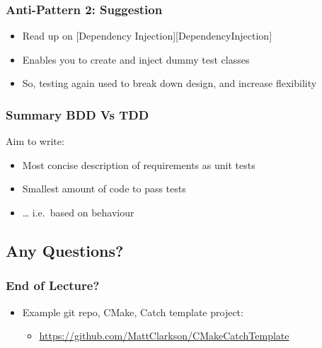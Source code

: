 \subsubsection{Anti-Pattern 2:
Suggestion}\label{anti-pattern-2-suggestion}

\begin{itemize}
\itemsep1pt\parskip0pt
\item
  Read up on {[}Dependency Injection{]}{[}DependencyInjection{]}
\item
  Enables you to create and inject dummy test classes
\item
  So, testing again used to break down design, and increase flexibility
\end{itemize}

\subsubsection{Summary BDD Vs TDD}\label{summary-bdd-vs-tdd}

Aim to write:

\begin{itemize}
\itemsep1pt\parskip0pt
\item
  Most concise description of requirements as unit tests
\item
  Smallest amount of code to pass tests
\item
  \ldots{} i.e.~based on behaviour
\end{itemize}

\subsection{Any Questions?}\label{any-questions}

\subsubsection{End of Lecture?}\label{end-of-lecture}

\begin{itemize}
\itemsep1pt\parskip0pt
\item
  Example git repo, CMake, Catch template project:

  \begin{itemize}
  \itemsep1pt\parskip0pt
  \item
    \url{https://github.com/MattClarkson/CMakeCatchTemplate}
  \end{itemize}
\end{itemize}

